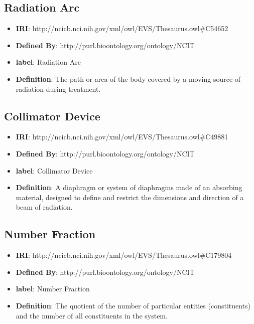 \documentclass[a4paper,12pt,oneside]{article}
\begin{document}
  \subsection{Radiation Arc}

\begin{itemize}
	\item \textbf{IRI}: http://ncicb.nci.nih.gov/xml/owl/EVS/Thesaurus.owl\#C54652
	\item \textbf{Defined By}: http://purl.bioontology.org/ontology/NCIT
	\item \textbf{label}: Radiation Arc
	\item \textbf{Definition}: The path or area of the body covered by a moving source of radiation during treatment.
\end{itemize}

  \subsection{Collimator Device}

\begin{itemize}
	\item \textbf{IRI}: http://ncicb.nci.nih.gov/xml/owl/EVS/Thesaurus.owl\#C49881
	\item \textbf{Defined By}: http://purl.bioontology.org/ontology/NCIT
	\item \textbf{label}: Collimator Device
	\item \textbf{Definition}: A diaphragm or system of diaphragms made of an absorbing material, designed to define and restrict the dimensions and direction of a beam of radiation.
\end{itemize}

  \subsection{Number Fraction}

\begin{itemize}
	\item \textbf{IRI}: http://ncicb.nci.nih.gov/xml/owl/EVS/Thesaurus.owl\#C179804
	\item \textbf{Defined By}: http://purl.bioontology.org/ontology/NCIT
	\item \textbf{label}: Number Fraction
	\item \textbf{Definition}: The quotient of the number of particular entities (constituents) and the number of all constituents in the system.
\end{itemize}
\end{document}
